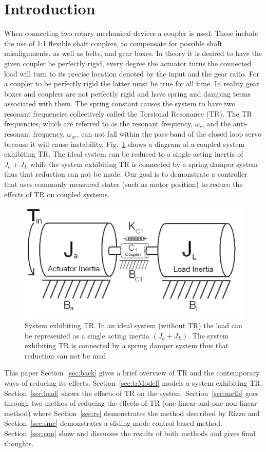 \section{Introduction}

When connecting two rotary mechanical devices a coupler is used. These include the use of 1:1 flexible shaft couplers, to compensate for possible shaft misalignments, as well as belts, and gear boxes. In theory it is desired to have the given coupler be perfectly rigid, every degree the actuator turns the connected load will turn to its precise location denoted by the input and the gear ratio. For a coupler to be perfectly rigid the latter must be true for all time. In reality gear boxes and couplers are not perfectly rigid and have spring and damping terms associated with them. The spring constant causes the system to have two resonant frequencies collectively called the Torsional Resonance (TR). The TR frequencies, which are referred to as the resonant frequency, $\omega_r$, and the anti-resonant frequency, $\omega_{ar}$, can not fall within the pass-band of the closed loop servo because it will cause instability.  Fig.~\ref{fig:couple} shows a diagram of a coupled system exhibiting TR. The ideal system can be reduced to a single acting inertia of $J_a+J_L$ while the system exhibiting TR is connected by a spring damper system thus that reduction can not be made.  Our goal is to demonstrate a controller that uses commonly measured states (such as motor position) to reduce the effects of TR on coupled systems.

\begin{figure}[t]
  \centering
\includegraphics[width=1.0\columnwidth]{./pix/couple.png}
  \caption{System exhibiting TR. In an ideal
system (without TR) the load can be represented as a single acting inertia $(J_a+J_L)$.  The system exhibiting TR is connected by a
spring damper system thus that reduction can not be mad}
  \label{fig:couple}
\end{figure}

This paper 
Section~\ref{sec:back} gives a brief overview of TR and the contemporary ways of reducing its effects.
Section~\ref{sec:trModel} models a system exhibiting TR. 
Section~\ref{sec:load} shows the effects of TR on the system.
Section~\ref{sec:meth} goes through two methos of reducing the effects of TR (one linear and one non-linear method) where
Section~\ref{sec:re} demonstrates the method described by Rizzo and
Section~\ref{sec:smc} demonstrates a sliding-mode control based method.
Section~\ref{sec:con} show and discusses the results of both methods and gives final thoughts.


